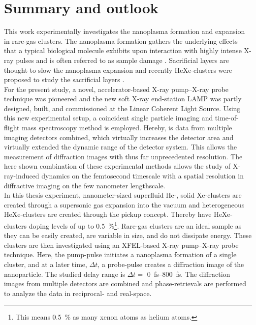 \chapter{Summary and outlook}\label{ch:summary_outlook}
%
This work experimentally investigates the nanoplasma formation and expansion in rare-gas clusters. The nanoplasma formation gathers the underlying effects that a typical biological molecule exhibits upon interaction with highly intense X-ray pulses and is often referred to as sample damage \cite{Neutze-2000-Nature,Arbeiter-2011-NJP}. Sacrificial layers are thought to slow the nanoplasma expansion \cite{Hau-Riege-2007-PRL,Hau-Riege-2010-PRL} and recently HeXe-clusters were proposed to study the sacrificial layers \cite{Mikaberidze-2008-PRA}.\\[0.9\baselineskip]
%
For the present study, a novel, accelerator-based X-ray pump--X-ray probe technique was pioneered \citep{Lutman-2013-PRL} and the new soft X-ray end-station LAMP was partly designed, built, and commissioned \citep{Ferguson-2015-JSR} at the Linear Coherent Light Source. Using this new experimental setup, a coincident single particle imaging and time-of-flight mass spectroscopy method is employed. Hereby, is data from multiple imaging detectors combined, which virtually increases the detector area and virtually extended the dynamic range of the detector system. This allows the measurement of diffraction images with thus far unprecedented resolution. The here shown combination of these experimental methods allows the study of X-ray-induced dynamics on the femtosecond timescale with a spatial resolution in diffractive imaging on the few nanometer lengthscale.\\[0.9\baselineskip]
%
In this thesis experiment, nanometer-sized superfluid He-, solid Xe-clusters are created through a supersonic gas expansion into the vacuum and heterogeneous HeXe-clusters are created through the pickup concept. Thereby have HeXe-clusters doping levels of up to \SI{0.5}{\percent}\footnote{This means \SI{0.5}{\percent} as many xenon atoms as helium atoms.}. Rare-gas clusters are an ideal sample as they can be easily created, are variable in size, and do not dissipate energy. These clusters are then investigated using an XFEL-based X-ray pump--X-ray probe technique. Here, the pump-pulse initiates a nanoplasma formation of a single cluster, and at a later time, $\Delta t$, a probe-pulse creates a diffraction image of the nanoparticle. The studied delay range is $\Delta t=$ \SIrange{0}{800}{\femto\second}. The diffraction images from multiple detectors are combined and phase-retrievals are performed to analyze the data in reciprocal- and real-space.\\[0.8\baselineskip]
